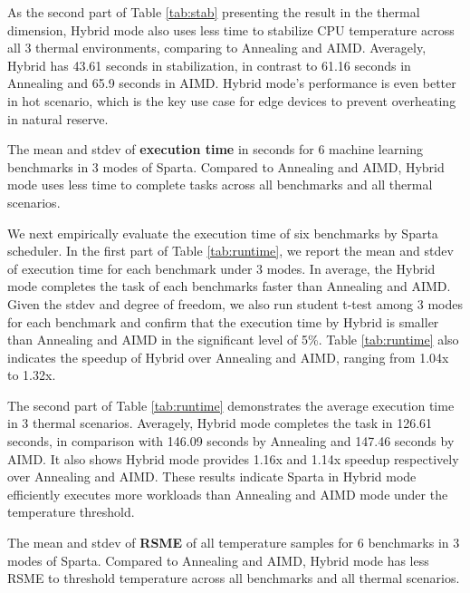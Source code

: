 

As the second part of Table \ref{tab:stab} presenting the result in the thermal dimension, Hybrid mode also uses less time to stabilize CPU temperature across all 3 thermal environments, comparing to Annealing and AIMD. Averagely, Hybrid has 43.61 seconds in stabilization, in contrast to 61.16 seconds in Annealing and 65.9 seconds in AIMD. Hybrid mode's performance is even better in hot scenario, which is the key use case for edge devices to prevent overheating in natural reserve.

\begin{table}[t]
\caption{The mean and stdev of \textbf{execution time} in seconds for 6 machine learning benchmarks in 3 modes of Sparta. Compared to Annealing and AIMD, Hybrid mode uses less time to complete tasks across all benchmarks and all thermal scenarios. }\label{tab:runtime}
\vspace{1mm}
\centering
\resizebox{350pt}{!}{}
\newline
\vspace{3mm}
\newline
\resizebox{350pt}{!}{}
\end{table}


We next empirically evaluate the execution time of six benchmarks by Sparta scheduler. In the first part of Table \ref{tab:runtime}, we report the mean and stdev of execution time for each benchmark under 3 modes. In average, the Hybrid mode completes the task of each benchmarks faster than Annealing and AIMD. Given the stdev and degree of freedom, we also run student t-test among 3 modes for each benchmark and confirm that the execution time by Hybrid is smaller than Annealing and AIMD in the significant level of 5\%. Table \ref{tab:runtime} also indicates the speedup of Hybrid over Annealing and AIMD, ranging from 1.04x to 1.32x. 

The second part of Table \ref{tab:runtime} demonstrates the average execution time in 3 thermal scenarios. Averagely, Hybrid mode completes the task in 126.61 seconds, in comparison with 146.09 seconds by Annealing and 147.46 seconds by AIMD. It also shows Hybrid mode provides 1.16x and 1.14x speedup respectively over Annealing and AIMD. These results indicate Sparta in Hybrid mode efficiently executes more workloads than Annealing and AIMD mode under the temperature threshold. 



\begin{table}[t]
\caption{The mean and stdev of \textbf{RSME} of all temperature samples for 6 benchmarks in 3 modes of Sparta. Compared to Annealing and AIMD, Hybrid mode has less RSME to threshold temperature across all benchmarks and all thermal scenarios.}\label{tab:rsme}
\vspace{1mm}
\centering
\resizebox{350pt}{!}{}
\newline
\vspace{3mm}
\newline
\resizebox{350pt}{!}{}
\end{table}


